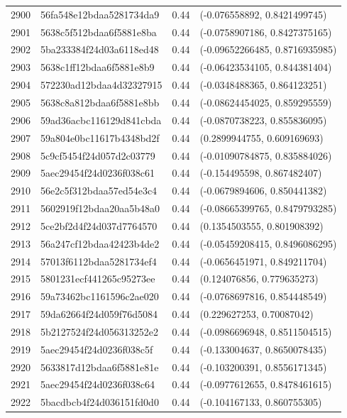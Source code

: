 \begin{table}[ht]
\begin{tabular}{rlrl}
  2900 & 56fa548e12bdaa5281734da9 & 0.44 & (-0.076558892, 0.8421499745) \\ 
  2901 & 5638c5f512bdaa6f5881e8ba & 0.44 & (-0.0758907186, 0.8427375165) \\ 
  2902 & 5ba233384f24d03a6118ed48 & 0.44 & (-0.09652266485, 0.8716935985) \\ 
  2903 & 5638c1ff12bdaa6f5881e8b9 & 0.44 & (-0.06423534105, 0.844381404) \\ 
  2904 & 572230ad12bdaa4d32327915 & 0.44 & (-0.0348488365, 0.864123251) \\ 
  2905 & 5638c8a812bdaa6f5881e8bb & 0.44 & (-0.08624454025, 0.859295559) \\ 
  2906 & 59ad36acbc116129d841cbda & 0.44 & (-0.0870738223, 0.855836095) \\ 
  2907 & 59a804e0bc11617b4348bd2f & 0.44 & (0.2899944755, 0.609169693) \\ 
  2908 & 5c9cf5454f24d057d2c03779 & 0.44 & (-0.01090784875, 0.835884026) \\ 
  2909 & 5aec29454f24d0236f038c61 & 0.44 & (-0.154495598, 0.867482407) \\ 
  2910 & 56e2c5f312bdaa57ed54e3c4 & 0.44 & (-0.0679894606, 0.850441382) \\ 
  2911 & 5602919f12bdaa20aa5b48a0 & 0.44 & (-0.08665399765, 0.8479793285) \\ 
  2912 & 5ce2bf2d4f24d037d7764570 & 0.44 & (0.1354503555, 0.801908392) \\ 
  2913 & 56a247cf12bdaa42423b4de2 & 0.44 & (-0.05459208415, 0.8496086295) \\ 
  2914 & 57013f6112bdaa5281734ef4 & 0.44 & (-0.0656451971, 0.849211704) \\ 
  2915 & 5801231ecf441265c95273ee & 0.44 & (0.124076856, 0.779635273) \\ 
  2916 & 59a73462bc1161596c2ae020 & 0.44 & (-0.0768697816, 0.854448549) \\ 
  2917 & 59da62664f24d059f76d5084 & 0.44 & (0.229627253, 0.70087042) \\ 
  2918 & 5b2127524f24d056313252e2 & 0.44 & (-0.0986696948, 0.8511504515) \\ 
  2919 & 5aec29454f24d0236f038c5f & 0.44 & (-0.133004637, 0.8650078435) \\ 
  2920 & 5633817d12bdaa6f5881e81e & 0.44 & (-0.103200391, 0.8556171345) \\ 
  2921 & 5aec29454f24d0236f038c64 & 0.44 & (-0.0977612655, 0.8478461615) \\ 
  2922 & 5bacdbcb4f24d036151fd0d0 & 0.44 & (-0.104167133, 0.860755305) \\ 

\end{tabular}
\end{table}
